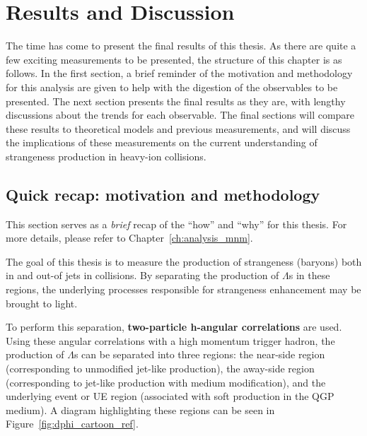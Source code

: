 \chapter{Results and Discussion}
\label{chapter_results}

The time has come to present the final results of this thesis. As there are quite a few exciting measurements to be presented, the structure of this chapter is as follows. In the first section, a brief reminder of the motivation and methodology for this analysis are given to help with the digestion of the observables to be presented. The next section presents the final results as they are, with lengthy discussions about the trends for each observable. The final sections will compare these results to theoretical models and previous measurements, and will discuss the implications of these measurements on the current understanding of strangeness production in heavy-ion collisions.


\section{Quick recap: motivation and methodology}

This section serves as a \textit{brief} recap of the ``how'' and ``why'' for this thesis. For more details, please refer to Chapter~\ref{ch:analysis_mnm}.

The goal of this thesis is to measure the production of strangeness (\lmb baryons) both in and out-of jets in \pPb collisions. By separating the production of $\Lambda$s in these regions, the underlying processes responsible for strangeness enhancement may be brought to light.

To perform this separation, \textbf{two-particle h-\lmb angular correlations} are used. Using these angular correlations with a high momentum trigger hadron, the production of $\Lambda$s can be separated into three regions: the near-side region (corresponding to unmodified jet-like production), the away-side region (corresponding to jet-like production with medium modification), and the underlying event or UE region (associated with soft production in the QGP medium). A diagram highlighting these regions can be seen in Figure~\ref{fig:dphi_cartoon_ref}.

